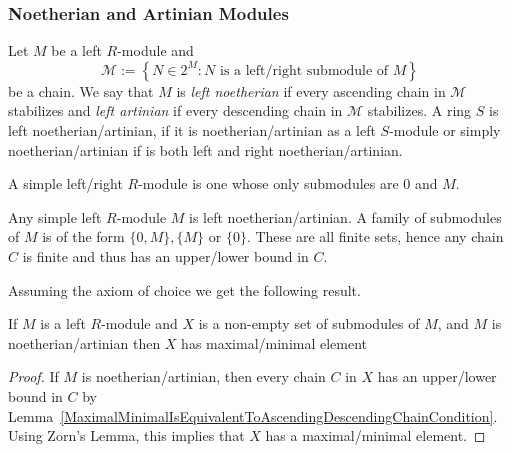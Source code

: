 \subsubsection{Noetherian and Artinian Modules}
\begin{definition}\label{NoetherianArtinianDef}
    Let $M$ be a left $R$-module and 
    $$\mathcal{M} := \left\{ N\in 2^M : N \text{ is a left/right submodule of } M \right\}$$
    be a chain. We say that $M$ is \textit{left noetherian} if every ascending chain in $\mathcal{M}$ stabilizes and \textit{left artinian} if every descending chain in $\mathcal{M}$ stabilizes. A ring $S$ is left noetherian/artinian, if it is noetherian/artinian as a left $S$-module or simply noetherian/artinian if is both left and right noetherian/artinian.  
\end{definition}
\begin{definition}
    A simple left/right $R$-module is one whose only submodules are $0$ and $M$.
\end{definition}
\begin{example}
    Any simple left $R$-module $M$ is left noetherian/artinian. A family of submodules of $M$ is of the form $\{0,M\},\{M\}$ or $\{0\}$. These are all finite sets, hence any chain $C$ is finite and thus has an upper/lower bound in $C$.
\end{example}
Assuming the axiom of choice we get the following result.
\begin{proposition}\label{NoetherianRespArtinianImpliesMaximalMinimalElement}
    If $M$ is a left $R$-module and $X$ is a non-empty set of submodules of $M$, and $M$ is noetherian/artinian then $X$ has maximal/minimal element
\end{proposition}
\begin{proof}
    If $M$ is noetherian/artinian, then every chain $C$ in $X$ has an upper/lower bound in $C$ by Lemma~\ref{MaximalMinimalIsEquivalentToAscendingDescendingChainCondition}. Using Zorn's Lemma, this implies that $X$ has a maximal/minimal element.  
\end{proof}

